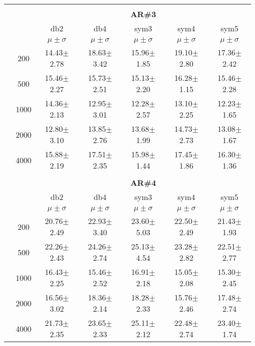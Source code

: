 \begin{table}[H]
\begin{tabular}{|c|c|c c c c c|}
\\ \midrule
\multicolumn{7}{c}{}\\ 



\cline{3-7}
\multicolumn{2}{c|}{\multirow{3}{*}{}} & \multicolumn{5}{c|}{\textbf{AR\#3}}   \\\cline{3-7} 

\multicolumn{2}{c|}{}  & db2 & db4 & sym3 & sym4 & sym5 \\\cline{3-7}
\multicolumn{2}{c|}{}& $\mu \pm \sigma$ & $\mu \pm \sigma$ & $\mu \pm \sigma$ & $\mu \pm \sigma$ & $\mu \pm \sigma$ \\\hline

\multicolumn{1}{|c|}{ \multirow{5}{*}{\rotatebox[origin=c]{90}{\textbf{Neurônios}}} }
&200	&14.43$\pm$2.78	&18.63$\pm$3.42	&15.96$\pm$1.85	&19.10$\pm$2.80	&17.36$\pm$2.42\\\cline{2-7}
&500	&15.46$\pm$2.27 &15.73$\pm$2.51	&15.13$\pm$2.20	&16.28$\pm$1.15	&15.46$\pm$2.28\\\cline{2-7}
&1000	&14.36$\pm$2.13	&12.95$\pm$3.01	&12.28$\pm$2.57	&13.10$\pm$2.25	&12.23$\pm$1.65\\\cline{2-7}
&2000	&12.80$\pm$3.10	&13.85$\pm$2.76	&13.68$\pm$1.99	&14.73$\pm$2.73	&13.08$\pm$1.67\\\cline{2-7}
&4000	&15.88$\pm$2.19	&17.51$\pm$2.35	&15.98$\pm$1.44	&17.45$\pm$1.86	&16.30$\pm$1.36\\\midrule 
\multicolumn{7}{c}{}\\ 



\cline{3-7}
\multicolumn{2}{c|}{\multirow{3}{*}{}} & \multicolumn{5}{c|}{\textbf{AR\#4}}   \\\cline{3-7} 

\multicolumn{2}{c|}{}  & db2 & db4 & sym3 & sym4 & sym5 \\\cline{3-7}
\multicolumn{2}{c|}{}& $\mu \pm \sigma$ & $\mu \pm \sigma$ & $\mu \pm \sigma$ & $\mu \pm \sigma$ & $\mu \pm \sigma$ \\\hline

\multicolumn{1}{|c|}{ \multirow{5}{*}{\rotatebox[origin=c]{90}{\textbf{Neurônios}}} }
&200	&20.76$\pm$2.49	&22.93$\pm$3.40	&23.60$\pm$5.03	&22.50$\pm$2.49	&21.43$\pm$1.93\\\cline{2-7}
&500	&22.26$\pm$2.43	&24.26$\pm$2.74	&25.13$\pm$4.54	&23.28$\pm$2.82	&22.51$\pm$2.77\\\cline{2-7}
&1000	&16.43$\pm$2.25	&15.46$\pm$2.52	&16.91$\pm$2.18	&15.05$\pm$2.08	&15.30$\pm$2.45\\\cline{2-7}
&2000	&16.56$\pm$3.02	&18.36$\pm$2.14	&18.28$\pm$2.33	&15.76$\pm$2.46	&17.48$\pm$2.74\\\cline{2-7}
&4000	&21.73$\pm$2.35	&23.65$\pm$2.33	&25.11$\pm$2.12	&22.48$\pm$2.74	&23.40$\pm$1.74

\\\midrule
	\end{tabular}

\end{table}%


